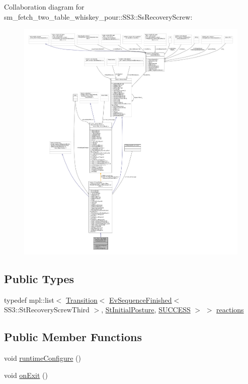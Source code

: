 Collaboration diagram for sm\+\_\+fetch\+\_\+two\+\_\+table\+\_\+whiskey\+\_\+pour\+:\+:S\+S3\+:\+:Ss\+Recovery\+Screw\+:
\nopagebreak
\begin{figure}[H]
\begin{center}
\leavevmode
\includegraphics[width=350pt]{structsm__fetch__two__table__whiskey__pour_1_1SS3_1_1SsRecoveryScrew__coll__graph}
\end{center}
\end{figure}
\subsection*{Public Types}
\begin{DoxyCompactItemize}
\item 
typedef mpl\+::list$<$ \hyperlink{classsmacc_1_1Transition}{Transition}$<$ \hyperlink{structsmacc_1_1default__events_1_1EvSequenceFinished}{Ev\+Sequence\+Finished}$<$ S\+S3\+::\+St\+Recovery\+Screw\+Third $>$, \hyperlink{structsm__fetch__two__table__whiskey__pour_1_1StInitialPosture}{St\+Initial\+Posture}, \hyperlink{structsmacc_1_1default__transition__tags_1_1SUCCESS}{S\+U\+C\+C\+E\+SS} $>$ $>$ \hyperlink{structsm__fetch__two__table__whiskey__pour_1_1SS3_1_1SsRecoveryScrew_af4bfbbfce8ff5c008c9c5494feedea30}{reactions}
\end{DoxyCompactItemize}
\subsection*{Public Member Functions}
\begin{DoxyCompactItemize}
\item 
void \hyperlink{structsm__fetch__two__table__whiskey__pour_1_1SS3_1_1SsRecoveryScrew_a9571faaaefe4f3047d9e30d2798eeb15}{runtime\+Configure} ()
\item 
void \hyperlink{structsm__fetch__two__table__whiskey__pour_1_1SS3_1_1SsRecoveryScrew_a7922191675af3dffe62e5fc7d6768774}{on\+Exit} ()
\end{DoxyCompactItemize}

